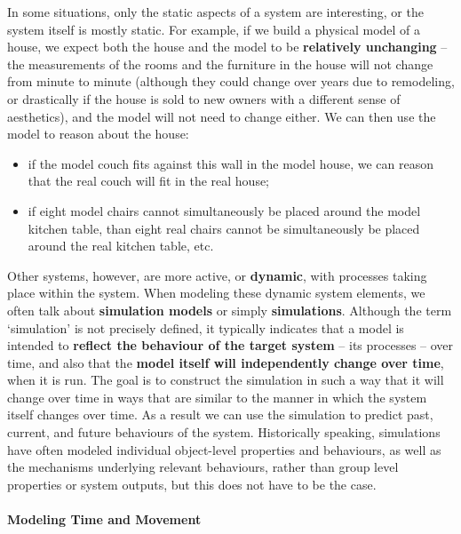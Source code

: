 In some situations, only the static aspects of a system are interesting, or the system itself is mostly static. For example, if we build a physical model of a house, we expect both the house and the model to be \textbf{relatively unchanging} -- the measurements of the rooms and the furniture in the house will not change from minute to minute (although they could change over years due to remodeling, or drastically if the house is sold to new owners with a different sense of aesthetics), and the model will not need to change either. We can then use the model to reason about the house: 
\begin{itemize}[noitemsep]
\item if the model couch fits against this wall in the model house, we can reason that the real couch will fit in the real house;
\item if eight model chairs cannot simultaneously be placed around the model kitchen table, than eight real chairs cannot be simultaneously be placed around the real kitchen table, etc.
\end{itemize}
Other systems, however, are more active, or \textbf{dynamic}, with processes taking place within the system. When modeling these dynamic system elements, we often talk about \textbf{simulation models} or simply \textbf{simulations}. Although the term `simulation' is not precisely defined, it typically indicates that a model is intended to \textbf{reflect the behaviour of the target system} -- its processes -- over time, and also that the \textbf{model itself will independently change over time}, when it is run. The goal is to construct the simulation in such a way that it will change over time in ways that are similar to the manner in which the system itself changes over time. As a result we can use the simulation to predict past, current, and future behaviours of the system. Historically speaking, simulations have often modeled individual object-level properties and behaviours, as well as the mechanisms underlying relevant behaviours, rather than group level properties or system outputs, but this does not have to be the case.
\newpage\noindent
\paragraph{Modeling Time and Movement}


